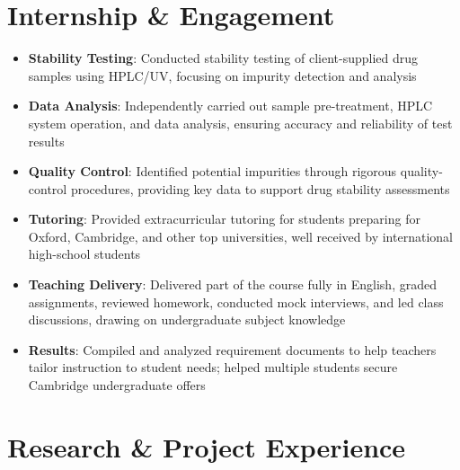 \documentclass{my-resume}
\begin{document}
\section{Internship \& Engagement}
\begin{itemize}[parsep=0.2ex]
  \item \textbf{Stability Testing}: Conducted stability testing of client-supplied drug samples using HPLC/UV, focusing on impurity detection and analysis
  \item \textbf{Data Analysis}: Independently carried out sample pre-treatment, HPLC system operation, and data analysis, ensuring accuracy and reliability of test results
  \item \textbf{Quality Control}: Identified potential impurities through rigorous quality-control procedures, providing key data to support drug stability assessments
\end{itemize}
\begin{itemize}[parsep=0.2ex]
  \item \textbf{Tutoring}: Provided extracurricular tutoring for students preparing for Oxford, Cambridge, and other top universities, well received by international high-school students
  \item \textbf{Teaching Delivery}: Delivered part of the course fully in English, graded assignments, reviewed homework, conducted mock interviews, and led class discussions, drawing on undergraduate subject knowledge
  \item \textbf{Results}: Compiled and analyzed requirement documents to help teachers tailor instruction to student needs; helped multiple students secure Cambridge undergraduate offers
\end{itemize}

\section{Research \& Project Experience}
\end{document}
